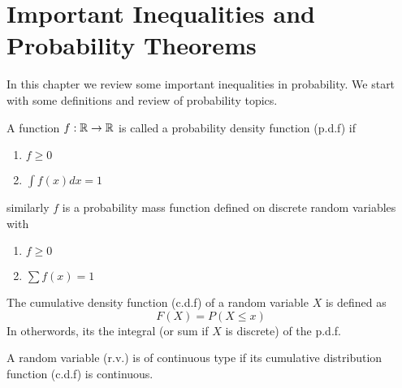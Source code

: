 
\chapter{Important Inequalities and Probability Theorems}
In this chapter we review some important inequalities in
probability. We start with some definitions and review of probability topics. 
\begin{definition}
    A function $f: \mathbb{R} \rightarrow \mathbb{R}$ is called a probability density function (p.d.f) if
    \begin{enumerate}[label=(\roman*)]
        \item $f \geq 0$
        \item $\int f(x)dx = 1$
    \end{enumerate}
    similarly $f$ is a probability mass function defined on discrete random variables with 
    \begin{enumerate}
        \item $f \geq 0$
        \item $\sum f(x) = 1$
    \end{enumerate}
\end{definition}
\begin{definition}
    The cumulative density function (c.d.f) of a random variable $X$ is defined as
    \[F(X) = P(X \leq x)\]
    In otherwords, its the integral (or sum if $X$ is discrete) of the p.d.f. 
\end{definition}
\begin{definition}
    A random variable (r.v.) is of continuous type if its cumulative distribution function (c.d.f) is continuous. 
\end{definition}


